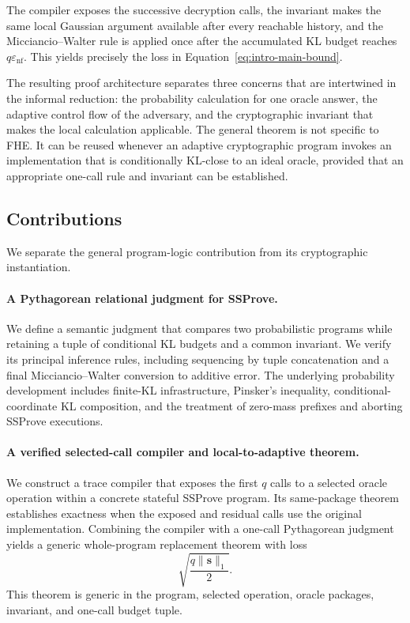 The compiler exposes the successive decryption calls, the invariant makes the same local Gaussian argument available after every reachable history, and the Micciancio--Walter rule is applied once after the accumulated KL budget reaches $q\varepsilon_{\mathrm{nf}}$. This yields precisely the loss in Equation~\eqref{eq:intro-main-bound}.

The resulting proof architecture separates three concerns that are intertwined in the informal reduction: the probability calculation for one oracle answer, the adaptive control flow of the adversary, and the cryptographic invariant that makes the local calculation applicable. The general theorem is not specific to FHE. It can be reused whenever an adaptive cryptographic program invokes an implementation that is conditionally KL-close to an ideal oracle, provided that an appropriate one-call rule and invariant can be established.

\subsection{Contributions}
\label{sec:intro-contributions}

We separate the general program-logic contribution from its cryptographic instantiation.

\paragraph{A Pythagorean relational judgment for SSProve.}
We define a semantic judgment that compares two probabilistic programs while retaining a tuple of conditional KL budgets and a common invariant. We verify its principal inference rules, including sequencing by tuple concatenation and a final Micciancio--Walter conversion to additive error. The underlying probability development includes finite-KL infrastructure, Pinsker's inequality, conditional-coordinate KL composition, and the treatment of zero-mass prefixes and aborting SSProve executions.

\paragraph{A verified selected-call compiler and local-to-adaptive theorem.}
We construct a trace compiler that exposes the first $q$ calls to a selected oracle operation within a concrete stateful SSProve program. Its same-package theorem establishes exactness when the exposed and residual calls use the original implementation. Combining the compiler with a one-call Pythagorean judgment yields a generic whole-program replacement theorem with loss
\[
\sqrt{\frac{q\lVert\mathbf{s}\rVert_{1}}{2}}.
\]
This theorem is generic in the program, selected operation, oracle packages, invariant, and one-call budget tuple.

